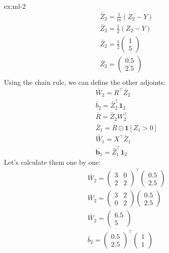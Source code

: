 \begin{solution}{ex:ml-2}
  \[
    \begin{gathered}
      \bar Z_2=\frac{1}{m}(Z_2-Y)\\
      \bar Z_2=\frac{1}{2}(Z_2-Y)\\
      \bar Z_2=\frac{1}{2}\begin{pmatrix}1\\5\end{pmatrix}\\
      \bar Z_2=\begin{pmatrix}0.5\\2.5\end{pmatrix}\\
    \end{gathered}
  \]
  Using the chain rule, we can define the other adjoints:
  \[
    \begin{gathered}
      \bar W_2=R^{\!\top}\bar Z_2\\
      \bar b_2=\bar Z_2^{\!\top}\mathbf{1}_2\\
      \bar R = \bar Z_2 W_2^{\!\top}\\
      \bar Z_1 = \bar R \odot \mathbf{1}[Z_1>0]\\
      \bar W_1 = X^{\!\top} \bar Z_1\\
      \bar{\mathbf{b}_1}=\bar Z_1^{\!\top}\mathbf{1}_2 
    \end{gathered} 
  \]
  Let's calculate them one by one:
  \[
    \begin{gathered}
      \bar W_2 = \begin{pmatrix}3&0\\2&2\end{pmatrix}^{\!\top} \begin{pmatrix}0.5\\2.5\end{pmatrix}\\
      \bar W_2 = \begin{pmatrix}3&2\\0&2\end{pmatrix} \begin{pmatrix}0.5\\2.5\end{pmatrix}\\
      \bar W_2 = \begin{pmatrix}6.5\\5\end{pmatrix}\\
      \bar b_2=\begin{pmatrix}0.5\\2.5\end{pmatrix}^{\!\top}\begin{pmatrix}1\\1\end{pmatrix} \\

\end{gathered}\]
\end{solution}
